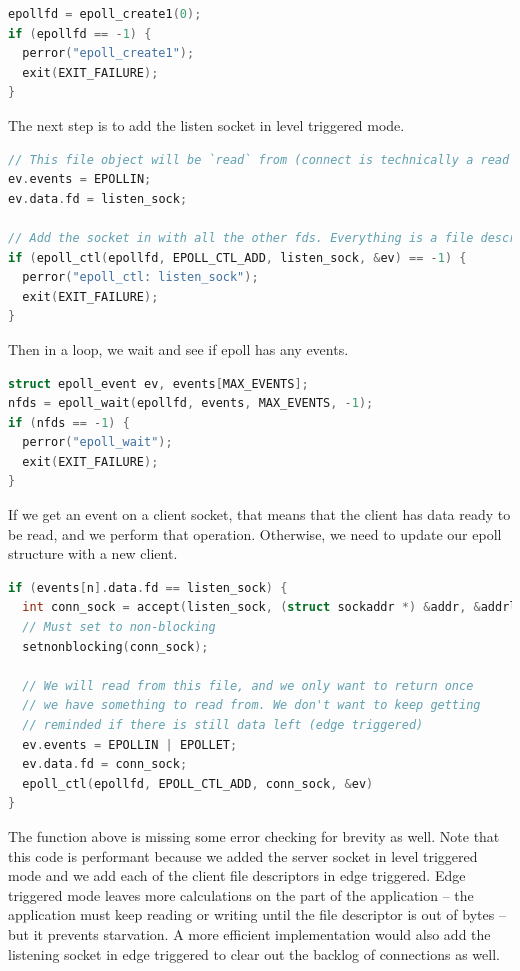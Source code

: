 \begin{lstlisting}[language=C]
epollfd = epoll_create1(0);
if (epollfd == -1) {
  perror("epoll_create1");
  exit(EXIT_FAILURE);
}
\end{lstlisting}

The next step is to add the listen socket in level triggered mode.
\begin{lstlisting}[language=C]
// This file object will be `read` from (connect is technically a read operation)
ev.events = EPOLLIN;
ev.data.fd = listen_sock;

// Add the socket in with all the other fds. Everything is a file descriptor
if (epoll_ctl(epollfd, EPOLL_CTL_ADD, listen_sock, &ev) == -1) {
  perror("epoll_ctl: listen_sock");
  exit(EXIT_FAILURE);
}
\end{lstlisting}

Then in a loop, we wait and see if epoll has any events.

\begin{lstlisting}[language=C]
struct epoll_event ev, events[MAX_EVENTS];
nfds = epoll_wait(epollfd, events, MAX_EVENTS, -1);
if (nfds == -1) {
  perror("epoll_wait");
  exit(EXIT_FAILURE);
}
\end{lstlisting}

If we get an event on a client socket, that means that the client has data ready to be read, and we perform that operation.
Otherwise, we need to update our epoll structure with a new client.

\begin{lstlisting}[language=C]
if (events[n].data.fd == listen_sock) {
  int conn_sock = accept(listen_sock, (struct sockaddr *) &addr, &addrlen);
  // Must set to non-blocking
  setnonblocking(conn_sock);

  // We will read from this file, and we only want to return once
  // we have something to read from. We don't want to keep getting
  // reminded if there is still data left (edge triggered)
  ev.events = EPOLLIN | EPOLLET;
  ev.data.fd = conn_sock;
  epoll_ctl(epollfd, EPOLL_CTL_ADD, conn_sock, &ev)
}
\end{lstlisting}

The function above is missing some error checking for brevity as well.
Note that this code is performant because we added the server socket in level triggered mode and we add each of the client file descriptors in edge triggered.
Edge triggered mode leaves more calculations on the part of the application -- the application must keep reading or writing until the file descriptor is out of bytes -- but it prevents starvation.
A more efficient implementation would also add the listening socket in edge triggered to clear out the backlog of connections as well.

